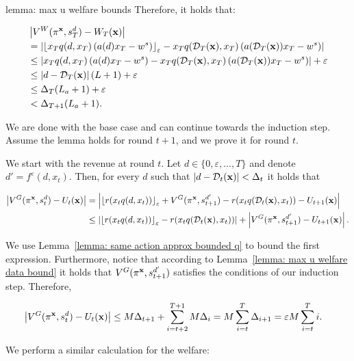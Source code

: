 \begin{proofof}{lemma: max u welfare bounds}
Therefore, it holds that:

\begin{align*}
&\left| V^W(\pi^{{\bf{x}}}, s_T^d) - W_T({\bf{x}}) \right| \\
&= \left| {\left\lfloor x_T q(d, x_T) \left(a(d) x_T - w^s \right)\right\rfloor_{\varepsilon}} - x_T q(\mathcal{D}_T({\bf{x}}), x_T) \left( a(\mathcal{D}_T({\bf{x}})) x_T - w^s \right) \right| \\
&\leq \left| x_T q(d, x_T) \left(a(d) x_T - w^s \right) - x_T q(\mathcal{D}_T({\bf{x}}), x_T) \left( a(\mathcal{D}_T({\bf{x}})) x_T - w^s \right) \right| + \varepsilon \\
&\leq \left| d - \mathcal{D}_T({\bf{x}}) \right| (L+1) + \varepsilon \\
&\leq \Delta_T (L_a+1) + \varepsilon \\
&< \Delta_{T+1} (L_a+1).
\end{align*}

We are done with the base case and can continue towards the induction step. Assume the lemma holds for round $t+1$, and we prove it for round $t$.

We start with the revenue at round $t$. Let $d \in \{ 0, \varepsilon, \ldots, T\}$ and denote $d' = f^\varepsilon (d, x_t)$. Then, for every $d$ such that $\left| d - \mathcal{D}_t({\bf{x}}) \right| < \Delta_t$ it holds that

\begin{align*}
\left| V^G(\pi^{{\bf{x}}}, s_t^d) - U_t({\bf{x}}) \right| &= \left| {\left\lfloor r(x_t q(d, x_t))\right\rfloor_{\varepsilon}} + V^G(\pi^{{\bf{x}}}, s_{t+1}^{d'}) - r(x_t q(\mathcal{D}_t({\bf{x}}), x_t)) - U_{t+1}({\bf{x}}) \right| \\
&\leq \left| {\left\lfloor r(x_t q(d, x_t))\right\rfloor_{\varepsilon}} - r(x_t q(\mathcal{D}_t({\bf{x}}), x_t)) \right| + \left| V^G(\pi^{{\bf{x}}}, s_{t+1}^{d'}) - U_{t+1}({\bf{x}}) \right|.
\end{align*}

We use Lemma~\ref{lemma: same action approx bounded q} to bound the first expression. Furthermore, notice that according to Lemma~\ref{lemma: max u welfare data bound} it holds that $V^G(\pi^{{\bf{x}}}, s_{t+1}^{d'})$ satisfies the conditions of our induction step. Therefore,

\begin{align*}
\left| V^G(\pi^{{\bf{x}}}, s_t^d) - U_t({\bf{x}}) \right| &\leq M\Delta_{t+1} + \sum_{i = t+2}^{T+1} M\Delta_i = M\sum_{i = t}^{T} \Delta_{i+1} = \varepsilon M\sum_{i = t}^T i.
\end{align*}

We perform a similar calculation for the welfare:


\end{proofof}
